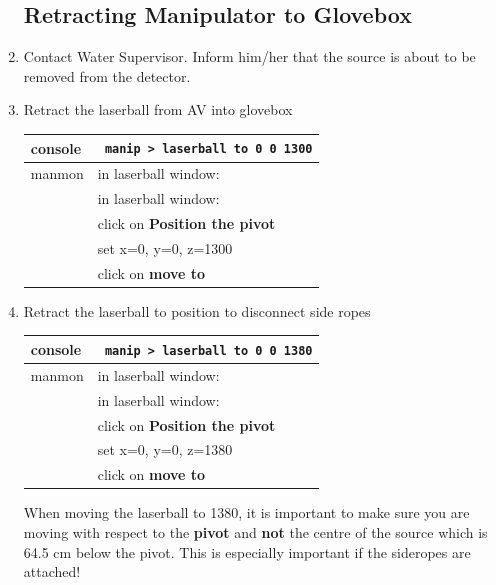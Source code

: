 \documentclass[11pt]{article}
\begin{document}
\begin{enumerate}
\subsection{Retracting Manipulator to Glovebox}
\item \CheckBox[name=rmg1]{} Contact Water Supervisor. Inform him/her that the source is about to be removed from the detector.
\item \CheckBox[name=rmg2]{} Retract the laserball from AV into glovebox
 \begin{center}
\begin{tabular}{|l|l|}
\hline
console & \verb+ manip > laserball to 0 0 1300+ \\
\hline
manmon & in laserball window: \\ &  in laserball window:\\ & click on {\bf Position the pivot} \\ & set x=0, y=0, z=1300 \\ & click on {\bf move to} \\
\hline
\end{tabular}
\end{center}
\item \CheckBox[name=rmg2]{} Retract the laserball to position to disconnect side ropes
 \begin{center}
\begin{tabular}{|l|l|}
\hline
console & \verb+ manip > laserball to 0 0 1380+ \\
\hline
manmon & in laserball window: \\ &  in laserball window:\\ & click on {\bf Position the pivot} \\ & set x=0, y=0, z=1380 \\ & click on {\bf move to} \\
\hline
\end{tabular}
\end{center}
When moving the laserball to 1380, it is important to make sure you are moving with respect to the {\bf pivot} and {\bf not} the centre of the source which is 64.5 cm below the pivot. This is especially important if the sideropes are attached!


\end{enumerate}
\end{document}
